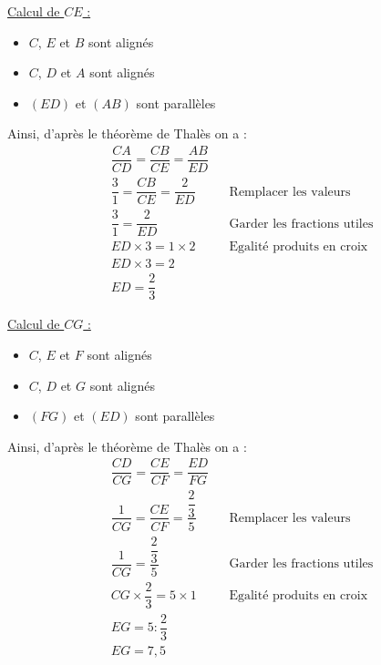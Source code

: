 \begin{multicols}{2}
  \underline{Calcul de $CE$ :}

  \begin{itemize}
    \item $C$, $E$ et $B$ sont alignés
    \item $C$, $D$ et $A$ sont alignés
    \item $(ED)$ et $(AB)$ sont parallèles
  \end{itemize}
  Ainsi, d'après le théorème de Thalès on a :
  \begin{align*}
    &\dfrac{CA}{CD}=\dfrac{CB}{CE}=\dfrac{AB}{ED}&&\\
    &\dfrac{3}{1}=\dfrac{CB}{CE}=\dfrac{2}{ED}&&\text{Remplacer les valeurs}\\
    &\dfrac{3}{1}=\dfrac{2}{ED}&&\text{Garder les fractions utiles}\\
    &ED\times 3=1\times 2 &&\text{Egalité produits en croix}\\
    &ED\times 3=2 &&\\
    &ED=\dfrac{2}{3} &&
  \end{align*}
  \columnbreak
  
  \underline{Calcul de $CG$ :}

  \begin{itemize}
    \item $C$, $E$ et $F$ sont alignés
    \item $C$, $D$ et $G$ sont alignés
    \item $(FG)$ et $(ED)$ sont parallèles
  \end{itemize}
  Ainsi, d'après le théorème de Thalès on a :
  \begin{align*}
    &\dfrac{CD}{CG}=\dfrac{CE}{CF}=\dfrac{ED}{FG}&&\\
    &\dfrac{1}{CG}=\dfrac{CE}{CF}=\dfrac{\dfrac{2}{3}}{5}&&\text{Remplacer les valeurs}\\
    &\dfrac{1}{CG}=\dfrac{\dfrac{2}{3}}{5} &&\text{Garder les fractions utiles}\\
    &CG\times \dfrac{2}{3}=5\times 1&&\text{Egalité produits en croix}\\
    &EG=5:\dfrac{2}{3} &&\\
    &EG=7,5 &&
  \end{align*}
\end{multicols}

\newpage

\exo{}{}


